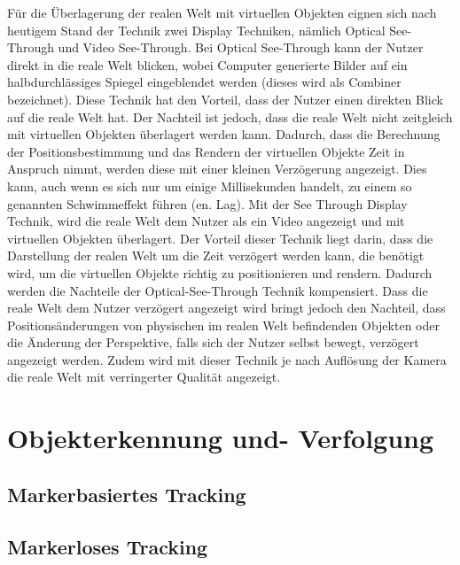 \cite[S.~32]{Tonnis2010} Für die Überlagerung der realen Welt mit virtuellen Objekten eignen sich nach heutigem Stand der Technik zwei Display Techniken, nämlich Optical See-Through und Video See-Through. 
Bei Optical See-Through kann der Nutzer direkt in die reale Welt blicken, wobei Computer generierte Bilder auf ein halbdurchlässiges Spiegel eingeblendet werden (dieses wird als Combiner bezeichnet).
Diese Technik hat den Vorteil, dass der Nutzer einen direkten Blick auf die reale Welt hat. Der Nachteil ist jedoch, dass die reale Welt nicht zeitgleich mit virtuellen Objekten überlagert werden kann. 
Dadurch, dass die Berechnung der Positionsbestimmung und das Rendern der virtuellen Objekte Zeit in Anspruch nimmt, werden diese mit einer kleinen Verzögerung angezeigt. Dies kann, auch 
wenn es sich nur um einige Millisekunden handelt, zu einem so genannten Schwimmeffekt führen (en. Lag). Mit der See Through Display Technik, wird die reale Welt dem Nutzer als ein Video 
angezeigt und mit virtuellen Objekten überlagert. Der Vorteil dieser Technik liegt darin, dass die Darstellung der realen Welt um die Zeit verzögert werden kann, die benötigt wird, um die virtuellen Objekte 
richtig zu positionieren und rendern. Dadurch werden die Nachteile der Optical-See-Through Technik kompensiert. Dass die reale Welt dem Nutzer verzögert angezeigt wird bringt jedoch den Nachteil, 
dass Positionsänderungen von physischen im realen Welt befindenden Objekten oder die Änderung der Perspektive, falls sich der Nutzer selbst bewegt, verzögert angezeigt werden. Zudem wird mit 
dieser Technik je nach Auflösung der Kamera die reale Welt mit verringerter Qualität angezeigt.

\section{Objekterkennung und- Verfolgung}



\subsection{Markerbasiertes Tracking}



\subsection{Markerloses Tracking}

